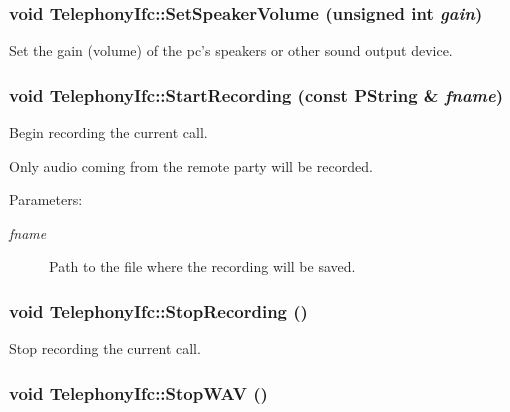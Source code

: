 \hypertarget{classTelephonyIfc_8cf9b680409dfad0e8453a93b1057af2}{
\subsubsection[{SetSpeakerVolume}]{\setlength{\rightskip}{0pt plus 5cm}void TelephonyIfc::SetSpeakerVolume (unsigned int {\em gain})}}
\label{classTelephonyIfc_8cf9b680409dfad0e8453a93b1057af2}


Set the gain (volume) of the pc's speakers or other sound output device. 

\hypertarget{classTelephonyIfc_2cd8176d99232038fbe8718417135b07}{
\subsubsection[{StartRecording}]{\setlength{\rightskip}{0pt plus 5cm}void TelephonyIfc::StartRecording (const PString \& {\em fname})}}
\label{classTelephonyIfc_2cd8176d99232038fbe8718417135b07}


Begin recording the current call. 

Only audio coming from the remote party will be recorded. \begin{Desc}
\item[Parameters:]
\begin{description}
\item[{\em fname}]Path to the file where the recording will be saved. \end{description}
\end{Desc}
\hypertarget{classTelephonyIfc_14352867be8fe5f0fcf501701e9052b2}{
\subsubsection[{StopRecording}]{\setlength{\rightskip}{0pt plus 5cm}void TelephonyIfc::StopRecording ()}}
\label{classTelephonyIfc_14352867be8fe5f0fcf501701e9052b2}


Stop recording the current call. 

\hypertarget{classTelephonyIfc_6bf03dc65c5128fc1b7c299a6e40740f}{
\subsubsection[{StopWAV}]{\setlength{\rightskip}{0pt plus 5cm}void TelephonyIfc::StopWAV ()}}
\label{classTelephonyIfc_6bf03dc65c5128fc1b7c299a6e40740f}


